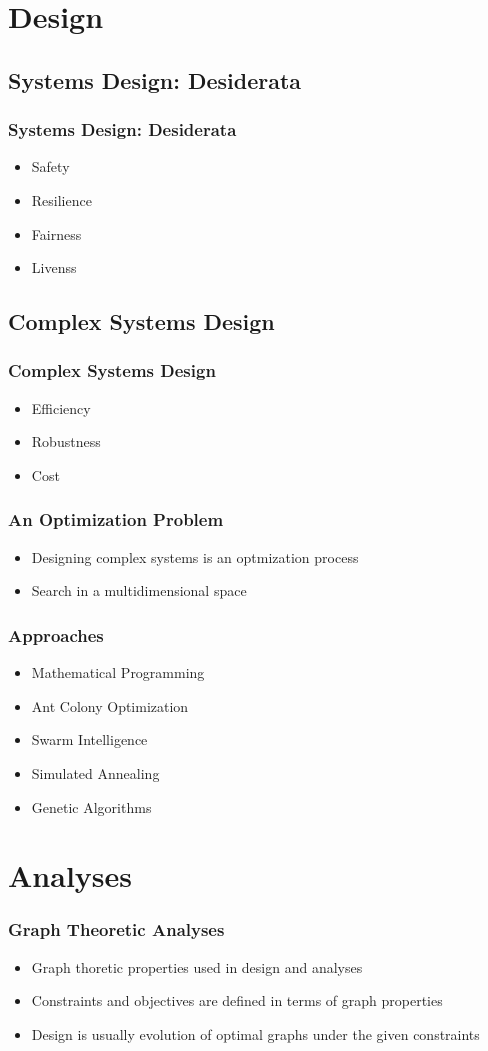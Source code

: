 \documentclass{beamer}
\begin{document}
\section{Design}
	\subsection{Systems Design: Desiderata}
	\frame
	{
		\frametitle{Systems Design: Desiderata}
		\begin{itemize}
			\item<1-> {Safety}
			\item<2-> {Resilience}
			\item<3-> {Fairness}
			\item<4-> {Livenss}
		\end{itemize}
	}

\subsection{Complex Systems Design}
	\frame
	{
		\frametitle{Complex Systems Design}
		\begin{itemize}
			\item<1-> {Efficiency}
			\item<2-> {Robustness}
			\item<3-> {Cost}
		\end{itemize}
	}


	\frame
	{
		\frametitle{An Optimization Problem}
			\begin{itemize}
				\item<1-> {Designing complex systems is an optmization process}
				\item<2-> {Search in a multidimensional space}
			\end{itemize}
	}

	\frame
	{
		\frametitle{Approaches}
			\begin{itemize}
				\item<1-> {Mathematical Programming}
				\item<1-> {Ant Colony Optimization}
				\item<1-> {Swarm Intelligence}
				\item<1-> {Simulated Annealing}
				\item<1-> {Genetic Algorithms}
			\end{itemize}
	}

\section{Analyses}
	\frame
	{
		\frametitle{Graph Theoretic Analyses}
			\begin{itemize}
				\item<1-> {Graph thoretic properties used in design and analyses}
				\item<2-> {Constraints and objectives are defined in terms of graph properties}
				\item<3-> {Design is usually evolution of optimal graphs under the given constraints}
			\end{itemize}
	}
\end{document}
